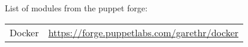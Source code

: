 List of modules from the puppet forge: \\
\begin{tabular}{l r}
Docker &  \url{https://forge.puppetlabs.com/garethr/docker} \\

\end{tabular}

\cleardoublepage{}
\printglossary[type=\acronymtype,title=Acronyms,style=long]

\printglossary[style=altlist,title=Glossary]






